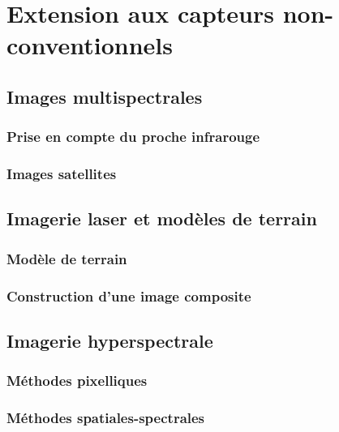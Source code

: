 \chapter{Extension aux capteurs non-conventionnels}

\section{Images multispectrales}

\subsection{Prise en compte du proche infrarouge}

\subsection{Images satellites}

\section{Imagerie laser et modèles de terrain}

\subsection{Modèle de terrain}

\subsection{Construction d'une image composite}

\section{Imagerie hyperspectrale}

\subsection{Méthodes pixelliques}

\subsection{Méthodes spatiales-spectrales}

